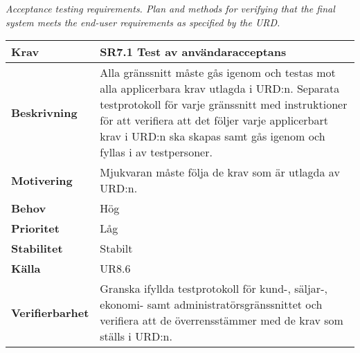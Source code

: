 \documentclass[a4paper, twoside, 11pt, titlepage]{article}
\begin{document}
	\emph{Acceptance testing requirements. Plan and methods for verifying that the final system meets the end-user requirements as specified by the URD.}

	\begin{tabular} { p{2.6cm} p{12.5cm} }
		\hline
		\sffamily\textbf{Krav} & \sffamily\textbf{SR7.1 Test av användaracceptans } \\
		\hline
		\sffamily\textbf{Beskrivning} & Alla gränssnitt måste gås igenom och testas mot alla applicerbara krav utlagda i URD:n. Separata testprotokoll för varje gränssnitt med instruktioner för att verifiera att det följer varje applicerbart krav i URD:n ska skapas samt gås igenom och fyllas i av testpersoner.  \\
		\hline
		\sffamily\textbf{Motivering} & Mjukvaran måste följa de krav som är utlagda av URD:n.  \\
		\hline
		\sffamily\textbf{Behov} & Hög  \\
		\hline
		\sffamily\textbf{Prioritet} & Låg  \\
		\hline
		\sffamily\textbf{Stabilitet} & Stabilt  \\
		\hline
		\sffamily\textbf{Källa} & UR8.6  \\
		\hline
		\sffamily\textbf{Verifierbarhet} & Granska ifyllda testprotokoll för kund-, säljar-, ekonomi- samt administratörsgränssnittet och verifiera att de överrensstämmer med de krav som ställs i URD:n.  \\
		\hline
	\end{tabular}
	\vspace{6mm}
\end{document}

